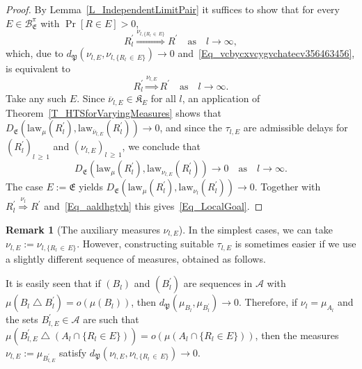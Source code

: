 \documentclass[10pt]{amsart}
\theoremstyle{definition}\newtheorem{defi}[theo]{Definition}\newtheorem{rema}[theo]{Remark}\newtheorem{exam}[theo]{Example}\newtheorem{exem}[theo]{Example}\newtheorem{nota}[theo]{Notation}
\newcommand{\clA}{\mathcal{A}}
\newcommand{\clB}{\mathcal{B}}
\newcommand{\law}{\mathrm{law}}
\newcommand{\frkK}{\mathfrak{K}}
\newcommand{\frkP}{\mathfrak{P}}
\newcommand{\frkE}{\mathfrak{E}}
\begin{document}
\begin{proof}
By Lemma~\ref{L_IndependentLimitPair} it suffices to show that for every $E\in\clB_{\frkE}^{\pi}$ with $\Pr[R\in E]>0$,
\[
R_{l}^{\prime}\overset{\nu_{l,\{R_{l}\,\in\,E\}}}{\Longrightarrow}R^{\prime }\quad\text{as}\quad l\rightarrow\infty,
\]
which, due to $d_{\frkP}(\nu_{l,E},\nu_{l,\{R_{l}\,\in\,E\}})\rightarrow0$ and~\eqref{Eq_vcbycxvcygvchatecv356463456}, is equivalent to
\begin{equation}\label{Eq_LocalGoal}
R_{l}^{\prime}\overset{\nu_{l,E}}{\Longrightarrow}R^{\prime}
\quad\text{as}\quad l\rightarrow\infty.
\end{equation}
Take any such $E$. Since $\overline{\nu}_{l,E}\in\frkK_{E}$ for all $l$, an application of Theorem~\ref{T_HTSforVaryingMeasures} shows that $D_{\frkE}(\law_{\mu}(R_{l}^{\prime}),\law _{\overline{\nu}_{l,E}}(R_{l}^{\prime}))\rightarrow0$, and since the $\tau_{l,E}$ are admissible delays for $(R_{l}^{\prime})_{l\,\geq\,1}$ and $(\nu_{l,E})_{l\,\geq\,1}$, we conclude that
\begin{equation}\label{Eq_aaldhgtyh}
D_{\frkE}\left(\law_{\mu}\left(R_{l}^{\prime}\right),\law_{\nu_{l,E} }\left(R_{l}^{\prime}\right)\right)\longrightarrow0\quad\text{as}\quad l\rightarrow
\infty.
\end{equation}
The case $E:=\frkE$ yields $D_{\frkE}(\law_{\mu} (R_{l}^{\prime}),\law_{\nu_{l}}(R_{l}^{\prime}))\rightarrow0$. Together with $R_{l}^{\prime}\overset{\nu_{l}}{\Longrightarrow}R^{\prime}$ and~\eqref{Eq_aaldhgtyh} this gives~\eqref{Eq_LocalGoal}.
\end{proof}



\begin{rema}[{The auxiliary measures $\nu_{l,E}$}]
In the simplest cases, we can take $\nu_{l,E}:=\nu_{l,\{R_{l}\,\in\,E\}}$. However, constructing suitable $\tau_{l,E}$ is sometimes easier if we use a slightly different sequence of measures, obtained as follows.

It is easily seen that if $(B_{l})$ and $(B_{l}^{\prime})$ are sequences in $\clA$ with $\mu(B_{l}\bigtriangleup B_{l}^{\prime})=o(\mu(B_{l}))$, then $d_{\frkP}(\mu_{B_{l}},\mu_{B_{l}^{\prime}})\rightarrow0$. Therefore, if $\nu_{l}=\mu_{A_{l}}$ and the sets $B_{l,E}^{\prime}
\in\clA$ are such that $\mu(B_{l,E}^{\prime}\bigtriangleup(A_{l}\cap\{R_{l}\in E\}))=o(\mu(A_{l}\cap\{R_{l}\in E\}))$, then the measures $\nu_{l,E}:=\mu_{B_{l,E}^{\prime}}$ satisfy $d_{\frkP}(\nu_{l,E},\nu_{l,\{R_{l}\,\in \,E\}})\rightarrow0$.
\end{rema}
\end{document}
